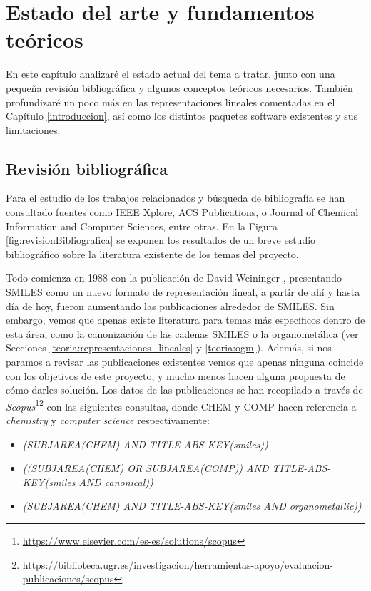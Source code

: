 
\chapter{Estado del arte y fundamentos teóricos}\label{estadoArte}

En este capítulo analizaré el estado actual del tema a tratar, junto con una pequeña revisión bibliográfica y algunos conceptos teóricos necesarios. También profundizaré un poco más en las representaciones lineales comentadas en el Capítulo \ref{introduccion}, así como los distintos paquetes software existentes y sus limitaciones. 

\section{Revisión bibliográfica} \label{revision_bib}
Para el estudio de los trabajos relacionados y búsqueda de bibliografía se han consultado fuentes como IEEE Xplore, ACS Publications, o Journal of Chemical Information and Computer Sciences, entre otras. En la Figura \ref{fig:revisionBibliografica} se exponen los resultados de un breve estudio bibliográfico sobre la literatura existente de los temas del proyecto. 

Todo comienza en 1988 con la publicación de David Weininger \cite{weininger_smiles_1988}, presentando SMILES como un nuevo formato de representación lineal, a partir de ahí y hasta día de hoy, fueron aumentando las publicaciones alrededor de SMILES. Sin embargo, vemos que apenas existe literatura para temas más específicos dentro de esta área, como la canonización de las cadenas SMILES o la organometálica (ver Secciones \ref{teoria:representaciones_lineales} y \ref{teoria:ogm}). Además, si nos paramos a revisar las publicaciones existentes vemos que apenas ninguna coincide con los objetivos de este proyecto, y mucho menos hacen alguna propuesta de cómo darles solución. Los datos de las publicaciones se han recopilado a través de \textit{Scopus}\footnote{\url{https://www.elsevier.com/es-es/solutions/scopus}}\footnotecomma\footnote{\url{https://biblioteca.ugr.es/investigacion/herramientas-apoyo/evaluacion-publicaciones/scopus}} con las siguientes consultas, donde CHEM y COMP hacen referencia a \textit{chemistry} y \textit{computer science} respectivamente: 
\begin{itemize}
    \item {\footnotesize \textit{(SUBJAREA(CHEM) AND TITLE-ABS-KEY(smiles))}} 
    \item {\footnotesize \textit{((SUBJAREA(CHEM) OR SUBJAREA(COMP)) AND TITLE-ABS-KEY(smiles AND canonical))}}
    \item {\footnotesize \textit{(SUBJAREA(CHEM) AND TITLE-ABS-KEY(smiles AND organometallic))}}
\end{itemize}

